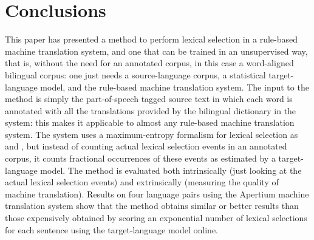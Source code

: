 \documentclass[11pt]{article}
\newcommand{\comment}[1]{\todo{#1}}
\begin{document}
\section{Conclusions}

This paper has
presented a method to perform lexical selection in a rule-based
machine translation system, and one that can be trained in an
unsupervised way, that is, without the need for an annotated corpus,
in this case a word-aligned bilingual corpus: one just needs a
source-language corpus, a statistical target-language model, and the
rule-based machine translation system. The input to the method is
simply the part-of-speech tagged source text in which each word is
annotated with all the translations provided by the bilingual
dictionary in the system: this makes it applicable to almost any
rule-based machine translation system. The system uses a
maximum-entropy formalism for lexical selection as \cite{berger1996}
and \cite{marechek10}, but instead of counting actual lexical
selection events in an annotated corpus, it counts fractional
occurrences of these events as estimated by a target-language
model. The method is evaluated both intrinsically (just looking at the
actual lexical selection events) and extrinsically (measuring the
quality of machine translation). Results on four language pairs using
the Apertium \citep{forcada2011apertium} machine translation system
show that the method obtains similar or better results than those
expensively obtained by scoring an exponential number of lexical
selections for each sentence using the target-language model online.

\end{document}
